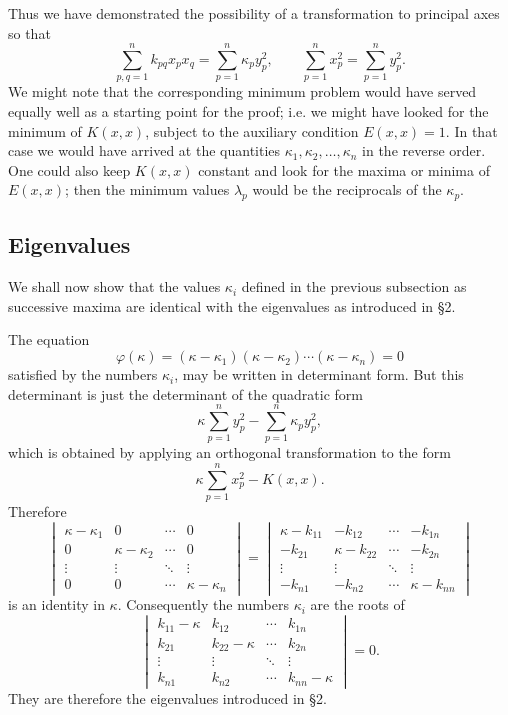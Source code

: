 Thus we have demonstrated the possibility of a transformation to principal axes so that
\[\sum_{p,q=1}^n k_{pq}x_px_q=\sum_{p=1}^n \kappa_p y_p^2,\qquad \sum_{p=1}^n x_p^2=\sum_{p=1}^n y_p^2.\]
We might note that the corresponding minimum problem would have served equally well as a starting point for the proof; i.e. we might have looked for the minimum of $K(x,x)$, subject to the auxiliary condition $E(x,x)=1$. In that case we would have arrived at the quantities $\kappa_1,\kappa_2,\ldots,\kappa_n$ in the reverse order. One could also keep $K(x,x)$ constant and look for the maxima or minima of $E(x,x)$; then the minimum values $\lambda_p$ would be the reciprocals of the $\kappa_p$.

\subsection{Eigenvalues}
We shall now show that the values $\kappa_i$ defined in the previous subsection as successive maxima are identical with the eigenvalues as introduced in \S2.

The equation
\[\varphi(\kappa)=(\kappa-\kappa_1)(\kappa-\kappa_2)\cdots(\kappa-\kappa_n)=0\]
satisfied by the numbers $\kappa_i$, may be written in determinant form. But this determinant is just the determinant of the quadratic form
\[\kappa\sum_{p=1}^n y_p^2-\sum_{p=1}^n \kappa_p y_p^2,\]
which is obtained by applying an orthogonal transformation to the form
\[\kappa\sum_{p=1}^n x_p^2-K(x,x).\]
Therefore
\[
\begin{vmatrix}
\kappa-\kappa_1&0&\cdots&0\\0&\kappa-\kappa_2&\cdots&0\\\vdots&\vdots&\ddots&\vdots\\0&0&\cdots&\kappa-\kappa_n
\end{vmatrix}
=
\begin{vmatrix}
\kappa-k_{11}&-k_{12}&\cdots&-k_{1n}\\-k_{21}&\kappa-k_{22}&\cdots&-k_{2n}\\\vdots&\vdots&\ddots&\vdots\\-k_{n1}&-k_{n2}&\cdots&\kappa-k_{nn}
\end{vmatrix}
\]
is an identity in $\kappa$. Consequently the numbers $\kappa_i$ are the roots of
\begin{equation}
\begin{vmatrix}
k_{11}-\kappa&k_{12}&\cdots&k_{1n}\\k_{21}&k_{22}-\kappa&\cdots&k_{2n}\\\vdots&\vdots&\ddots&\vdots\\k_{n1}&k_{n2}&\cdots&k_{nn}-\kappa
\end{vmatrix}=0. \tag{30}
\end{equation}
They are therefore the eigenvalues introduced in \S2.


